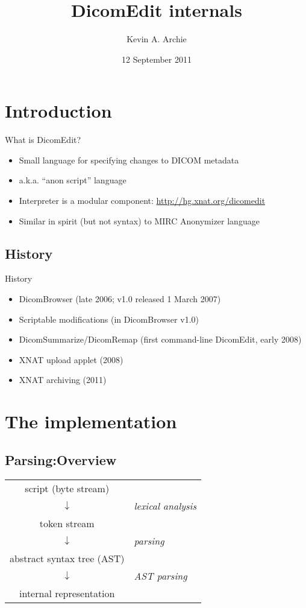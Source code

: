 \documentclass[handout]{beamer}
\title{DicomEdit internals}
\author{Kevin A. Archie}
\institute{Washington University Neuroinformatics Research Group}
\date{12 September 2011}
\begin{document}
\begin{frame}
\titlepage
\end{frame}

\section{Introduction}

\begin{frame}{What is DicomEdit?}
\begin{itemize}
\pause \item Small language for specifying changes to DICOM metadata
\pause \item a.k.a. ``anon script'' language
\pause \item Interpreter is a modular component:
\url{http://hg.xnat.org/dicomedit}
\pause \item Similar in spirit (but not syntax) to MIRC Anonymizer language
\end{itemize}
\end{frame}


\subsection{History}
\begin{frame}{History}
\begin{itemize}
\pause \item DicomBrowser (late 2006; v1.0 released 1 March 2007)
\pause \item Scriptable modifications (in DicomBrowser v1.0)
\pause \item DicomSummarize/DicomRemap (first command-line DicomEdit, early 2008)
\pause \item XNAT upload applet (2008)
\pause \item XNAT archiving (2011)
\end{itemize}
\end{frame}

\section{The implementation}
\subsection{Parsing:Overview}
\begin{frame}[fragile]
\centering
\begin{tabular}{cl}
script (byte stream) \\
$\downarrow$ & {\em lexical analysis} \\
token stream \\
$\downarrow$ & {\em parsing} \\
abstract syntax tree (AST) \\
$\downarrow$ & {\em AST parsing} \\
internal representation
\end{tabular}
\end{frame}
\end{document}
